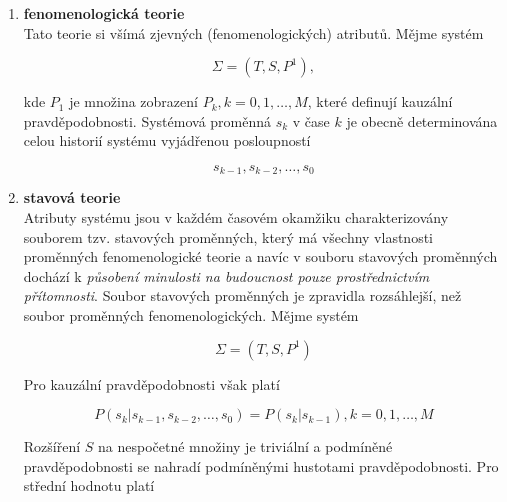 \begin{enumerate}[label=\alph*)]
\item \textbf{fenomenologická teorie}\\
Tato teorie si všímá zjevných (fenomenologických) atributů. Mějme systém

\[ \Sigma = (T,S,P^1), \]

kde $P_1$ je množina zobrazení $P_k, k=0,1,\ldots, M$, které definují kauzální pravděpodobnosti. Systémová proměnná $s_k$ v čase $k$ je obecně determinována celou historií systému vyjádřenou posloupností

\[ s_{k-1},s_{k-2},\ldots,s_0 \]

\item \textbf{stavová teorie}\\
Atributy systému jsou v každém časovém okamžiku charakterizovány souborem tzv. stavových proměnných, který má všechny vlastnosti proměnných fenomenologické teorie a navíc v souboru stavových proměnných dochází k \textit{působení minulosti na budoucnost pouze prostřednictvím přítomnosti}. Soubor stavových proměnných je zpravidla rozsáhlejší, než soubor proměnných fenomenologických. Mějme systém

\[ \Sigma = (T,S,P^1) \]

Pro kauzální pravděpodobnosti však platí

\[ P(s_k|s_{k-1},s_{k-2},\ldots,s_0) = P(s_k|s_{k-1}), k =0,1,\ldots,M \]

Rozšíření $S$ na nespočetné množiny je triviální a podmíněné pravděpodobnosti se nahradí podmíněnými hustotami pravděpodobnosti. Pro střední hodnotu platí

%
\end{enumerate}

